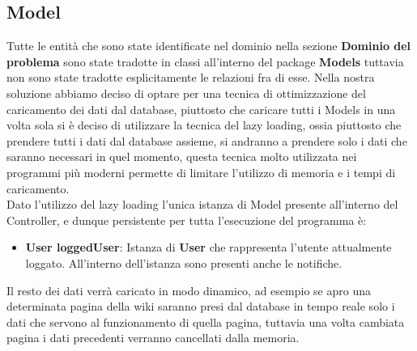 \documentclass{article}
\begin{document}
	\subsection{Model}
	Tutte le entit\`a che sono state identificate nel dominio nella sezione \textbf{Dominio del problema} sono state tradotte in classi all'interno del package \textbf{Models} tuttavia non sono state tradotte esplicitamente le relazioni fra di esse. 
	Nella nostra soluzione abbiamo deciso di optare per una tecnica di ottimizzazione del caricamento dei dati dal database,
	piuttosto che caricare tutti i Models in una volta sola si \`e deciso di utilizzare la tecnica del lazy loading, ossia piuttosto che prendere tutti i dati dal database assieme, si andranno a prendere solo i dati che saranno necessari in quel momento, questa tecnica molto utilizzata nei programmi pi\`u moderni permette di limitare l'utilizzo di memoria e i tempi di caricamento.
	\\
	Dato l'utilizzo del lazy loading l'unica istanza di Model presente all'interno del Controller, e dunque persistente per tutta l'esecuzione del programma \`e:
	
	\begin{itemize}
		\item \textbf{User loggedUser}: Istanza di \textbf{User} che rappresenta l'utente attualmente loggato. All'interno dell'istanza sono presenti anche le notifiche.
	\end{itemize}
	
	Il resto dei dati verr\`a caricato in modo dinamico, ad esempio se apro una determinata pagina della wiki saranno presi dal database in tempo reale solo i dati che servono al funzionamento di quella pagina, tuttavia una volta cambiata pagina i dati precedenti verranno cancellati dalla memoria.
\end{document}
